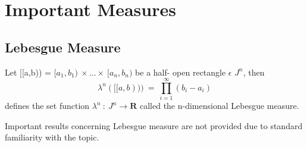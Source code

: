 \section{Important Measures}
\subsection{Lebesgue Measure}
\begin{definition}
    Let [[a,b)) = $[a_1,b_1) \: \times...\times \: [a_n,b_n)$ be a half- open
    rectangle $\epsilon$ $J^n$, then
    \[
        \lambda^n([[a,b))) \: = \: \prod_{i=1}^{\infty}(b_i - a_i)
    \]
        defines the set function $\lambda^n \: : \: J^n \rightarrow \bm{R}$
        called the n-dimensional Lebesgue measure.
\end{definition}
Important results concerning Lebesgue measure are not provided due to standard
familiarity with the topic.



